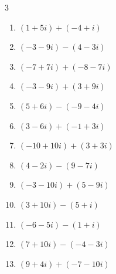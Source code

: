 \begin{multicols}{3}
\begin{enumerate}
  \item $\displaystyle (1+5i) + (-4+i)$

        \phantom{$\displaystyle =-3+6i$}

  \item $\displaystyle (-3-9i) - (4-3i)$

        \phantom{$\displaystyle =-7-6i$}

  \item $\displaystyle (-7+7i) + (-8-7i)$

        \phantom{$\displaystyle =-15$}

  \item $\displaystyle (-3-9i) + (3+9i)$

        \phantom{$\displaystyle =0$}

  \item $\displaystyle (5+6i) - (-9-4i)$

        \phantom{$\displaystyle =14+10i$}

\columnbreak %

  \item $\displaystyle (3-6i) + (-1+3i)$

        \phantom{$\displaystyle =2-3i$}

  \item $\displaystyle (-10+10i) + (3+3i)$

        \phantom{$\displaystyle =-7+13i$}

  \item $\displaystyle (4-2i) - (9-7i)$

        \phantom{$\displaystyle =-5+5i$}

  \item $\displaystyle (-3-10i) + (5-9i)$

        \phantom{$\displaystyle =2-19i$}

  \item $\displaystyle (3+10i) - (5+i)$

        \phantom{$\displaystyle =-2+9i$}

  \item $\displaystyle (-6-5i) - (1+i)$

        \phantom{$\displaystyle =-7-6i$}

  \item $\displaystyle (7+10i) - (-4-3i)$

        \phantom{$\displaystyle =11+13i$}

  \item $\displaystyle (9+4i) + (-7-10i)$


\end{enumerate}
\end{multicols}
